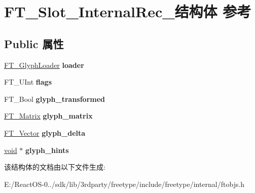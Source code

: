 \hypertarget{struct_f_t___slot___internal_rec__}{}\section{F\+T\+\_\+\+Slot\+\_\+\+Internal\+Rec\+\_\+结构体 参考}
\label{struct_f_t___slot___internal_rec__}
\subsection*{Public 属性}
\begin{DoxyCompactItemize}
\item 
\mbox{\label{struct_f_t___slot___internal_rec___ac57f8c939f667938ab9f986088c15d8f}} 
\hyperlink{struct_f_t___glyph_loader_rec__}{F\+T\+\_\+\+Glyph\+Loader} {\bfseries loader}
\item 
\mbox{\label{struct_f_t___slot___internal_rec___a9a2a287ba2b363197b36fe24d2f48746}} 
F\+T\+\_\+\+U\+Int {\bfseries flags}
\item 
\mbox{\label{struct_f_t___slot___internal_rec___ac2bba891ac70016b74c085a05c1f182c}} 
F\+T\+\_\+\+Bool {\bfseries glyph\+\_\+transformed}
\item 
\mbox{\label{struct_f_t___slot___internal_rec___a95af217daf1c2080692b5a69e345aa3b}} 
\hyperlink{struct_f_t___matrix__}{F\+T\+\_\+\+Matrix} {\bfseries glyph\+\_\+matrix}
\item 
\mbox{\label{struct_f_t___slot___internal_rec___a2a94b955dd1e260aaf8699238d44769d}} 
\hyperlink{struct_f_t___vector__}{F\+T\+\_\+\+Vector} {\bfseries glyph\+\_\+delta}
\item 
\mbox{\label{struct_f_t___slot___internal_rec___a16337853823cdccfb0c636673c4eb3ae}} 
\hyperlink{interfacevoid}{void} $\ast$ {\bfseries glyph\+\_\+hints}
\end{DoxyCompactItemize}


该结构体的文档由以下文件生成\+:\begin{DoxyCompactItemize}
\item 
E\+:/\+React\+O\+S-\/0../sdk/lib/3rdparty/freetype/include/freetype/internal/ftobjs.\+h\end{DoxyCompactItemize}
